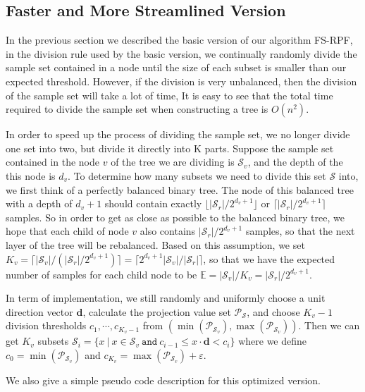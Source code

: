 \subsection{Faster and More Streamlined Version}
In the previous section we described the basic version of our algorithm FS-RPF, in the division rule used by the basic version, we continually randomly divide the sample set contained in a node until the size of each subset is smaller than our expected threshold.
However, if the division is very unbalanced, then the division of the sample set will take a lot of time, It is easy to see that the total time required to divide the sample set when constructing a tree is $O(n^2)$.

In order to speed up the process of dividing the sample set, we no longer divide one set into two, but divide it directly into K parts. 
Suppose the sample set contained in the node $v$ of the tree we are dividing is $\mathcal{S}_v$, and the depth of the this node is $d_v$.
To determine how many subsets we need to divide this set $\mathcal{S}$ into, we first think of a perfectly balanced binary tree. The node of this balanced tree with a depth of $d_v+1$ should contain exactly $\lfloor|\mathcal{S}_r|/2^{d_v+1}\rfloor$ or $\lceil|\mathcal{S}_r|/2^{d_v+1}\rceil$ samples. 
So in order to get as close as possible to the balanced binary tree, we hope that each child of node $v$ also contains $|\mathcal{S}_r|/2^{d_v+1}$ samples, so that the next layer of the tree will be rebalanced. 
Based on this assumption, we set $K_v=\lceil|\mathcal{S}_v|/(|\mathcal{S}_r|/2^{d_v+1})\rceil=\lceil2^{d_v+1}|\mathcal{S}_v|/|\mathcal{S}_r|\rceil$, so that we have the expected number of samples for each child node to be $\mathbb{E}=|\mathcal{S}_v|/K_v=|\mathcal{S}_r|/2^{d_v+1}$.

In term of implementation, we still randomly and uniformly choose a unit direction vector $\mathbf{d}$, calculate the projection value set $\mathcal{P}_{\mathcal{S}}$, and choose $K_v-1$ division thresholds $c_1,\cdots,c_{K_v-1}$ from $(\min(\mathcal{P}_{\mathcal{S}_v}),\max(\mathcal{P}_{\mathcal{S}_v}))$. Then we can get $K_v$ subsets $\mathcal{S}_i=\{x~|~x\in\mathcal{S}_v~\texttt{and}~c_{i-1}\leqslant x\cdot\mathbf{d}<c_i\}$ where we define $c_0=\min(\mathcal{P}_{\mathcal{S}_v})$ and $c_{K_v}=\max(\mathcal{P}_{\mathcal{S}_v})+\varepsilon$.

We also give a simple pseudo code description for this optimized version.

